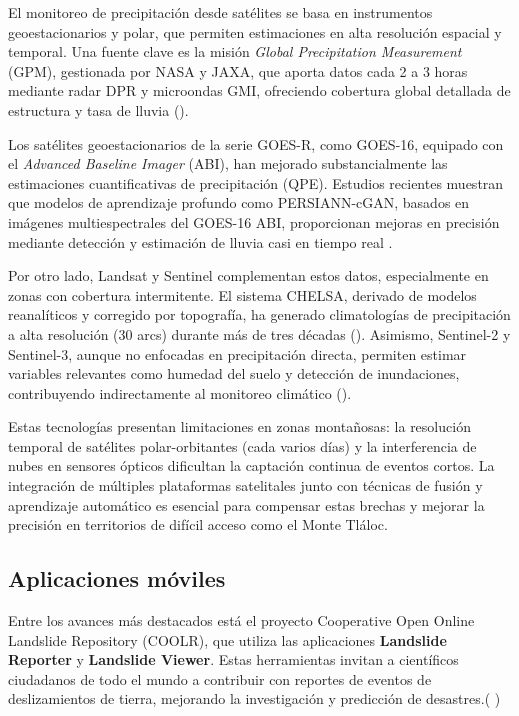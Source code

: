 El monitoreo de precipitación desde satélites se basa en instrumentos geoestacionarios y polar, que permiten estimaciones en alta resolución espacial y temporal. Una fuente clave es la misión \emph{Global Precipitation Measurement} (GPM), gestionada por NASA y JAXA, que aporta datos cada 2 a 3 horas mediante radar DPR y microondas GMI, ofreciendo cobertura global detallada de estructura y tasa de lluvia (\cite{gpm2014}).

Los satélites geoestacionarios de la serie GOES-R, como GOES-16, equipado con el \emph{Advanced Baseline Imager} (ABI), han mejorado substancialmente las estimaciones cuantificativas de precipitación (QPE). Estudios recientes muestran que modelos de aprendizaje profundo como PERSIANN-cGAN, basados en imágenes multiespectrales del GOES-16 ABI, proporcionan mejoras en precisión mediante detección y estimación de lluvia casi en tiempo real \cite{hayatbini2019}.

Por otro lado, Landsat y Sentinel complementan estos datos, especialmente en zonas con cobertura intermitente. El sistema CHELSA, derivado de modelos reanalíticos y corregido por topografía, ha generado climatologías de precipitación a alta resolución (30 arcs) durante más de tres décadas (\cite{karger2016}). Asimismo, Sentinel-2 y Sentinel-3, aunque no enfocadas en precipitación directa, permiten estimar variables relevantes como humedad del suelo y detección de inundaciones, contribuyendo indirectamente al monitoreo climático (\cite{declaro2024}).

Estas tecnologías presentan limitaciones en zonas montañosas: la resolución temporal de satélites polar-orbitantes (cada varios días) y la interferencia de nubes en sensores ópticos dificultan la captación continua de eventos cortos. La integración de múltiples plataformas satelitales junto con técnicas de fusión y aprendizaje automático es esencial para compensar estas brechas y mejorar la precisión en territorios de difícil acceso como el Monte Tláloc.


\subsection{Aplicaciones móviles}

Entre los avances más destacados está el proyecto Cooperative Open Online Landslide Repository (COOLR), que utiliza las aplicaciones \textbf{Landslide Reporter} y \textbf{Landslide Viewer}. Estas herramientas invitan a científicos ciudadanos de todo el mundo a contribuir con reportes de eventos de deslizamientos de tierra, mejorando la investigación y predicción de desastres.(\cite{coolr2021} )

